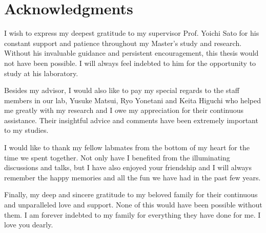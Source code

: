 
\chapter*{Acknowledgments}


I wish to express my deepest gratitude to my supervisor Prof. Yoichi Sato for his constant support and patience throughout my Master's study and research.
Without his invaluable guidance and persistent encouragement, this thesis would not have been possible. I will always feel indebted to him for the opportunity to study at his laboratory.

Besides my advisor, I would also like to pay my special regards to the staff members in our lab, Yusuke Matsui, Ryo Yonetani and Keita Higuchi who helped me greatly with my research and I owe my appreciation for their continuous assistance. Their insightful advice and comments have been extremely important to my studies.

I would like to thank my fellow labmates from the bottom of my heart for the time we spent together. Not only have I benefited from the illuminating discussions and talks, but I have also enjoyed your friendship and I will always remember the happy memories and all the fun we have had in the past few years.

Finally, my deep and sincere gratitude to my beloved family for their continuous and unparalleled love and support. None of this would have been possible without them. I am forever indebted to my family for everything they have done for me. I love you dearly.


